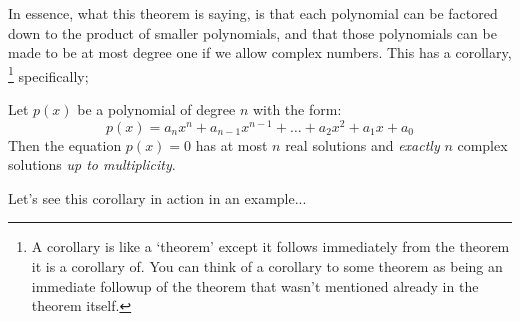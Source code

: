\documentclass{ximeraXloud}
\begin{document}
    In essence, what this theorem is saying, is that each polynomial can be factored down to the product of smaller polynomials, and that those polynomials can be made to be at most degree one if we allow complex numbers. This has a corollary,%
    \footnote{A corollary is like a `theorem' except it follows immediately from the theorem it is a corollary of. You can think of a corollary to some theorem as being an immediate followup of the theorem that wasn't mentioned already in the theorem itself.}
    specifically;
    
    \begin{corollary}
        Let $p(x)$ be a polynomial of degree $n$ with the form:
        \[
            p(x) = a_nx^n + a_{n-1}x^{n-1} + \dots + a_2x^2 + a_1x + a_0
        \]
        Then the equation $p(x) = 0$ has at most $n$ real solutions and \textit{exactly} $n$ complex solutions \textit{up to multiplicity}.
    \end{corollary}
    
    Let's see this corollary in action in an example...
    
\end{document}

